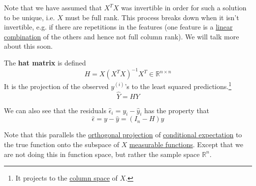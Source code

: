   Note that we have assumed that $X^T X$ was invertible in order for such a solution to be unique, i.e. $X$ must be full rank. This process breaks down when it isn't invertible, e.g. if there are repetitions in the features (one feature is a \hyperref[lin-def:linear-combination]{linear combination} of the others and hence not full column rank). We will talk more about this soon. 

  \begin{definition}
    \label{def:hat-matrix}
    The \textbf{hat matrix} is defined 
    \begin{equation}
      H = X (X^T X)^{-1} X^T \in \mathbb{R}^{n \times n}
    \end{equation}
    It is the projection of the observed $y^{(i)}$'s to the least squared predictions.\footnote{It projects to the \hyperref[lin-def:column-space]{column space} of $X$.} 
    \begin{equation}
      \hat{Y} = H Y
    \end{equation}
  \end{definition}

  We can also see that the residuals $\hat{\epsilon}_i = y_i - \hat{y}_i$ has the property that 
  \begin{equation}
    \hat{\epsilon} = y - \hat{y} = (I_n - H) y 
  \end{equation}

  Note that this parallels the \hyperref[lin-def:orthogonal-projection]{orthogonal projection} of \hyperref[prob-def:cond-exp]{conditional expectation} to the true function onto the subspace of $X$ \hyperref[mt-def:measurable-function]{measurable functions}. Except that we are not doing this in function space, but rather the sample space $\mathbb{R}^n$. 

